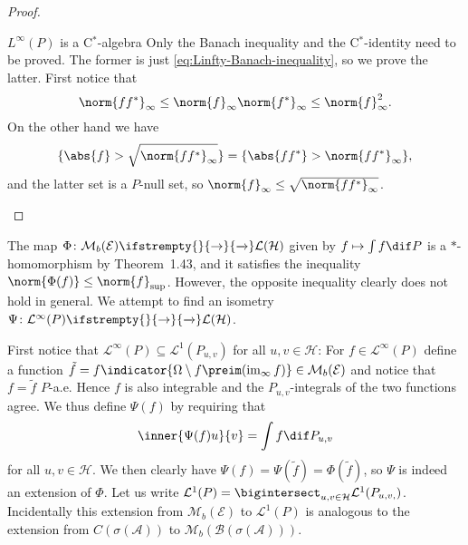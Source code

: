 \documentclass[article, a4paper, 11pt, oneside]{memoir}
\numberwithin{equation}{chapter}
\newcommand{\calB}{\mathcal{B}}
\newcommand{\calE}{\mathcal{E}}
\newcommand{\calA}{\mathcal{A}}
\newcommand{\calM}{\mathcal{M}}
\newcommand{\calL}{\mathcal{L}}
\newcommand{\calH}{\mathcal{H}}
\newcommand{\borel}[1]{\calB(#1)}
\renewcommand\to[1][]{%
    \ifstrempty{#1}{%
        \rightarrow
    }{%
        \xrightarrow[#1]{}
    }%
}
\begin{document}
\begin{proof}
\begin{proofsec}
    \item[$L^\infty(P)$ is a C$^*$-algebra]
    Only the Banach inequality and the C$^*$-identity need to be proved. The former is just \cref{eq:Linfty-Banach-inequality}, so we prove the latter. First notice that
    \begin{equation*}
        \norm{ff^*}_\infty
            \leq \norm{f}_\infty \norm{f^*}_\infty
            \leq \norm{f}_\infty^2.
    \end{equation*}
    On the other hand we have
    \begin{equation*}
        \{ \abs{f} > \sqrt{\norm{ff^*}_\infty} \}
            = \{ \abs{ff^*} > \norm{ff^*}_\infty \},
    \end{equation*}
    and the latter set is a $P$-null set, so $\norm{f}_\infty \leq \sqrt{\norm{ff^*}_\infty}$.
\end{proofsec}
\end{proof}

The map $\Phi \colon \calM_b(\calE) \to \calL(\calH)$ given by $f \mapsto \int f \dif P$ is a $*$-homomorphism by Theorem~1.43, and it satisfies the inequality $\norm{\Phi(f)} \leq \norm{f}_{\sup}$. However, the opposite inequality clearly does not hold in general. We attempt to find an isometry $\Psi \colon \calL^\infty(P) \to \calL(\calH)$.

First notice that $\calL^\infty(P) \subseteq \calL^1(P_{u,v})$ for all $u,v \in \calH$: For $f \in \calL^\infty(P)$ define a function $\tilde f = f \indicator{\Omega \setminus f\preim(\essran f)} \in \calM_b(\calE)$ and notice that $f = \tilde f$ $P$-a.e. Hence $f$ is also integrable and the $P_{u,v}$-integrals of the two functions agree. We thus define $\Psi(f)$ by requiring that
%
\begin{equation*}
    \inner{\Psi(f)u}{v}
        = \int f \dif P_{u,v}
\end{equation*}
%
for all $u,v \in \calH$. We then clearly have $\Psi(f) = \Psi(\tilde f) = \Phi(\tilde f)$, so $\Psi$ is indeed an extension of $\Phi$. Let us write $\calL^1(P) = \bigintersect_{u,v \in \calH} \calL^1(P_{u,v,})$. Incidentally this extension from $\calM_b(\calE)$ to $\calL^1(P)$ is analogous to the extension from $C(\sigma(\calA))$ to $\calM_b(\borel{\sigma(\calA)})$.
\end{document}
